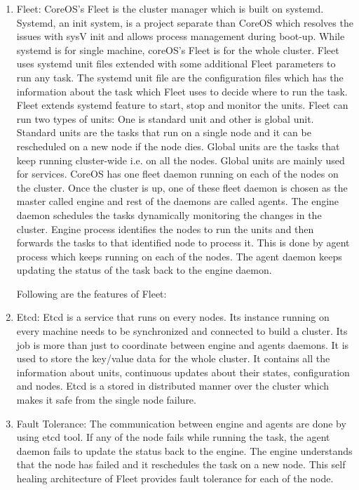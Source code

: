 \begin{enumerate}
\item Fleet:
CoreOS's Fleet is the cluster manager which is built on systemd. Systemd, an init system, is a project separate than CoreOS which resolves the issues with sysV init and allows process management during boot-up. While systemd is for single machine, coreOS's Fleet is for the whole cluster. Fleet uses systemd unit files extended with some additional Fleet parameters to run any task. The systemd unit file are the configuration files which has the information about the task which Fleet uses to decide where to run the task. Fleet extends systemd feature to start, stop and monitor the units. Fleet can run two types of units: One is standard unit and other is global unit. Standard units are the tasks that run on a single node and it can be rescheduled on a new node if the node dies. Global units are the tasks that keep running cluster-wide i.e. on all the nodes. Global units are mainly used for services.
CoreOS has one fleet daemon running on each of the nodes on the cluster. Once the cluster is up, one of these fleet daemon is chosen as the master called engine and rest of the daemons are called agents. The engine daemon schedules the tasks dynamically monitoring the changes in the cluster. Engine process identifies the nodes to run the units and then forwards the tasks to that identified node to process it. This is done by agent process which keeps running on each of the nodes. The agent daemon keeps updating the status of the task back to the engine daemon. 

Following are the features of Fleet:

\item Etcd:
Etcd is a service that runs on every nodes. Its instance running on every machine needs to be synchronized and connected to build a cluster. Its job is more than just to coordinate between engine and agents daemons. It is used to store the key/value data for the whole cluster. It contains all the information about units, continuous updates about their states, configuration and nodes. Etcd is a stored in distributed manner over the cluster which makes it safe from the single node failure. 

\item Fault Tolerance:
The communication between engine and agents are done by using etcd tool. If any of the node fails while running the task, the agent daemon fails to update the status back to the engine. The engine understands that the node has failed and it reschedules the task on a new node. This self healing architecture of Fleet provides fault tolerance for each of the node. 


\end{enumerate}
